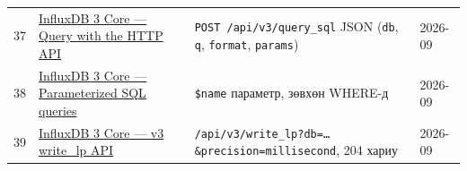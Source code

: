 \begin{longtable}[]{@{}llll@{}}
\begin{minipage}[t]{0.22\columnwidth}
37\strut
\end{minipage} & \begin{minipage}[t]{0.22\columnwidth}\raggedright
\href{https://docs.influxdata.com/influxdb3/core/query-data/execute-queries/influxdb-v3-api/}{InfluxDB 3 Core --- Query with the HTTP API}\strut
\end{minipage} & \begin{minipage}[t]{0.22\columnwidth}\raggedright
\texttt{POST\ /\allowbreak{}api/\allowbreak{}v3/\allowbreak{}query\_\allowbreak{}sql} JSON (\texttt{db}, \texttt{q}, \texttt{format}, \texttt{params})\strut
\end{minipage} & \begin{minipage}[t]{0.22\columnwidth}\raggedright
2026-09\strut
\end{minipage}\tabularnewline
\begin{minipage}[t]{0.22\columnwidth}\raggedright
38\strut
\end{minipage} & \begin{minipage}[t]{0.22\columnwidth}\raggedright
\href{https://docs.influxdata.com/influxdb3/core/query-data/sql/parameterized-queries/}{InfluxDB 3 Core --- Parameterized SQL queries}\strut
\end{minipage} & \begin{minipage}[t]{0.22\columnwidth}\raggedright
\texttt{\$name} параметр, зөвхөн WHERE-д\strut
\end{minipage} & \begin{minipage}[t]{0.22\columnwidth}\raggedright
2026-09\strut
\end{minipage}\tabularnewline
\begin{minipage}[t]{0.22\columnwidth}\raggedright
39\strut
\end{minipage} & \begin{minipage}[t]{0.22\columnwidth}\raggedright
\href{https://docs.influxdata.com/influxdb3/core/write-data/http-api/v3-write-lp/}{InfluxDB 3 Core --- v3 write\_\allowbreak{}lp API}\strut
\end{minipage} & \begin{minipage}[t]{0.22\columnwidth}\raggedright
\texttt{/\allowbreak{}api/\allowbreak{}v3/\allowbreak{}write\_\allowbreak{}lp?\allowbreak{}db=\allowbreak{}\ldots{}\&\allowbreak{}precision=\allowbreak{}millisecond}, 204 хариу\strut
\end{minipage} & \begin{minipage}[t]{0.22\columnwidth}\raggedright
2026-09\strut
\end{minipage}\tabularnewline
\bottomrule
\end{longtable}\endgroup
